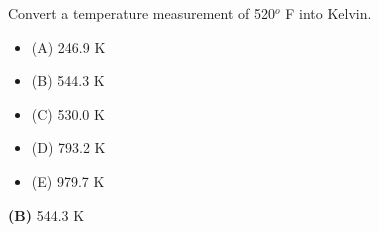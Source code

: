 

Convert a temperature measurement of 520$^{o}$ F into Kelvin.

\begin{itemize}
\item{(A)} 246.9 K
\vskip 5pt 
\item{(B)} 544.3 K
\vskip 5pt 
\item{(C)} 530.0 K
\vskip 5pt 
\item{(D)} 793.2 K
\vskip 5pt 
\item{(E)} 979.7 K
\end{itemize}







{\bf (B)} 544.3 K
 









